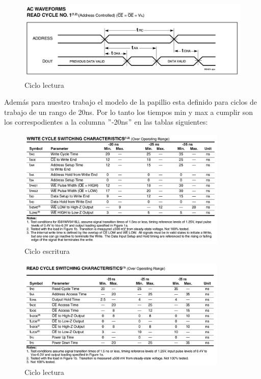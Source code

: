 \documentclass[10pt]{article}
\begin{document}
\begin{figure}[hbtp]
\centering
\includegraphics[width=12cm]{read-form.png}
\caption{Ciclo lectura}
\label{Cic2}
\end{figure}

\newpage

Además para nuestro trabajo el modelo de la papillio esta definido para ciclos de trabajo de un rango de 20ns. Por lo tanto los tiempos min y max a cumplir son los correspodientes a la columna $"$-20ns$"$ en las tablas siguientes:

\begin{figure}[hbtp]
\centering
\includegraphics[width=10cm]{write-data.png}
\caption{Ciclo escritura}
\label{Cic3}
\end{figure}

\begin{figure}[hbtp]
\centering
\includegraphics[width=10cm]{read-data.png}
\caption{Ciclo lectura}
\label{Cic4}
\end{figure}

\newpage
\end{document}
